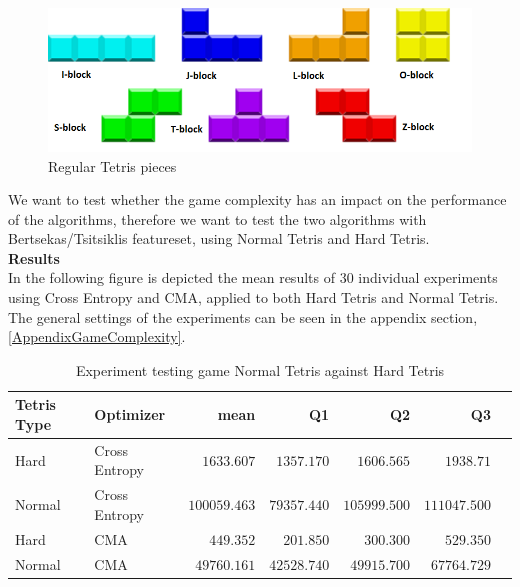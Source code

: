 \begin{figure}[H]
\begin{center}
\includegraphics[scale=0.6]{img/Pieces}
\end{center}
\caption{Regular Tetris pieces \label{fig:TetrisPieces}}
\end{figure}

We want to test whether the game complexity has an impact on the performance of the algorithms,
therefore we want to test the two algorithms with Bertsekas/Tsitsiklis featureset, using Normal Tetris and Hard Tetris.\\

\textbf{Results}\\
In the following figure is depicted the mean results of 30 individual experiments using Cross Entropy and CMA, applied to both Hard Tetris and Normal Tetris. The general settings of the experiments can be seen in the appendix section, \ref{AppendixGameComplexity}.

\begin{table}[H]
\centering
\small
\begin{tabular}{l l r r r r r}
Tetris Type & Optimizer & mean & Q1 & Q2 & Q3\\
\hline
Hard & Cross Entropy & $1633.607$ & $1357.170$ & $1606.565$ & $1938.71$\\
Normal & Cross Entropy & $100059.463$ & $79357.440$ & $105999.500$ & $111047.500$\\
Hard & CMA & $449.352$ & $201.850$ & $300.300$ & $529.350$\\
Normal & CMA & $49760.161$ & $42528.740$ & $49915.700$ & $67764.729$\\
\end{tabular}
\caption{Experiment testing game Normal Tetris against Hard Tetris}
\end{table}

